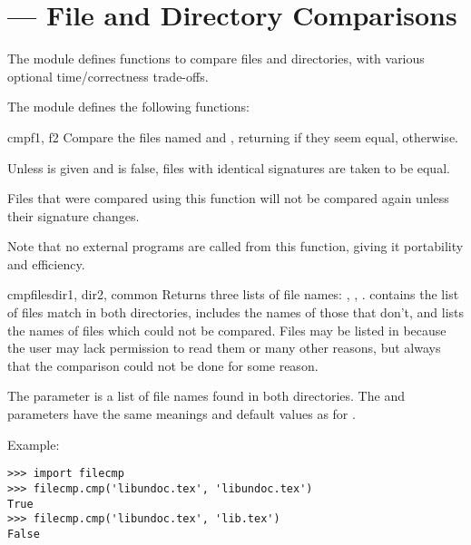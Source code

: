 \section{ ---
         File and Directory Comparisons}



The  module defines functions to compare files and
directories, with various optional time/correctness trade-offs.

The  module defines the following functions:

\begin{funcdesc}{cmp}{f1, f2}
Compare the files named  and , returning  if
they seem equal,  otherwise.

Unless  is given and is false, files with identical
 signatures are taken to be equal.

Files that were compared using this function will not be compared again
unless their  signature changes.

Note that no external programs are called from this function, giving it
portability and efficiency.
\end{funcdesc}

\begin{funcdesc}{cmpfiles}{dir1, dir2, common}
Returns three lists of file names: , ,
.   contains the list of files match in both
directories,  includes the names of those that don't,
and  lists the names of files which could not be
compared.  Files may be listed in  because the user may
lack permission to read them or many other reasons, but always that
the comparison could not be done for some reason.

The  parameter is a list of file names found in both directories.
The  and  parameters have the same
meanings and default values as for .
\end{funcdesc}

Example:

\begin{verbatim}
>>> import filecmp
>>> filecmp.cmp('libundoc.tex', 'libundoc.tex')
True
>>> filecmp.cmp('libundoc.tex', 'lib.tex')
False
\end{verbatim}


